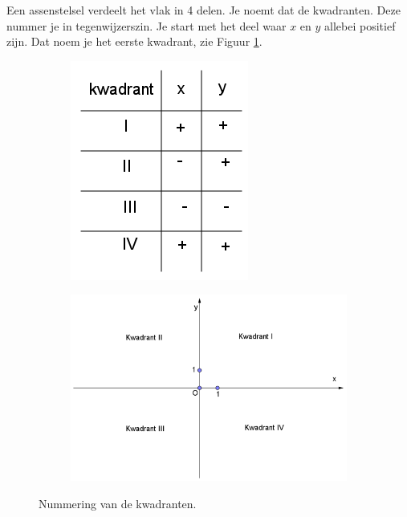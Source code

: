 

Een assenstelsel verdeelt het vlak in 4 delen.
Je noemt dat de kwadranten.
Deze nummer je in tegenwijzerszin. 
Je start met het deel waar $x$ en $y$ allebei positief zijn.
Dat noem je het eerste kwadrant, zie Figuur \ref{fig4.2.2_fig5}.

\begin{figure}[!htb]
	\begin{center}
		\begin{subfigure}{.48\linewidth}
		\centering
		\includegraphics[width=.5\linewidth]{4_opp_inhoud_an_meetk/inputs/AMTekst2Fig5}
		\end{subfigure}
		\begin{subfigure}{.48\linewidth}
		\centering
		\includegraphics[width=\linewidth]{4_opp_inhoud_an_meetk/inputs/AMTekst2Fig6}
		\end{subfigure}
\caption{Nummering van de kwadranten.}
\label{fig4.2.2_fig5}
\end{center}
\end{figure}
